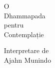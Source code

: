 
\thispagestyle{empty}

{\centering

\vspace*{10mm}

\chapterTitleFont\LARGE

O\\
Dhammapada\\
pentru\\
Contemplație

\vspace*{10mm}

\normalsize

Interpretare de\\
Ajahn Munindo

\vfill


}

